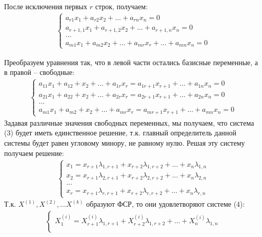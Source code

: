 \begin{answer}
  После исключения первых $r$ строк, получаем:
  \begin{gather*}
    \begin{cases}
      a_{r1} x_1 + a_{r2} x_2 + \ldots + a_{rn} x_{n} = 0 \\
      a_{r+1,1} x_1 + a_{r+1,2} x_2 + \ldots + a_{r+1,n} x_{n} = 0 \\
      \ldots \\
      a_{m1} x_1 + a_{m2} x_2 + \ldots + a_{mr} x_{r} + \ldots + a_{mn} x_{n} = 0
    \end{cases} \tag{2}
  \end{gather*}

  Преобразуем уравнения так, что в левой части остались базисные переменные, а в правой -- свободные:
  \begin{gather*}
    \begin{cases}
      a_{11} x_1 + a_{12} + x_2 + \ldots + a_{1r} x_{r} = a_{1r+1} x_{r+1} + \ldots + a_{1n} x_{n} = 0 \\
      a_{21} x_1 + a_{22} + x_2 + \ldots + a_{2r} x_{r} = a_{2r+1} x_{r+1} + \ldots + a_{2n} x_{n} = 0 \\
    \ldots \\
      a_{m1} x_1 + a_{m2} + x_2 + \ldots + a_{mr} x_{r} = a_{mr+1} x_{r+1} + \ldots + a_{mn} x_{n} = 0 \tag{3}
    \end{cases}
  \end{gather*}
  Задавая различные значения свободных переменных, мы получаем, что система (3) будет иметь единственное решение, т.к. главный определитель данной системы будет равен угловому минору, не равному нулю.
  Решая эту систему получаем решение:
  \begin{gather*}
    \begin{cases}
      x_1 = x_{r+1} \lambda_{1,r+1} + x_{r+2} \lambda_{1,r+2} + \ldots + x_{n} \lambda_{1, n} \\
      x_2 = x_{r+1} \lambda_{2,r+1} + x_{r+2} \lambda_{2,r+2} + \ldots + x_{n} \lambda_{2, n} \\
      \ldots \\
      x_r = x_{r+1} \lambda_{r,r+1} + x_{r+2} \lambda_{r,r+2} + \ldots + x_{n} \lambda_{r, n} \tag{4}
    \end{cases}
  \end{gather*}
  Т.к. $X^{(1)}, X^{(2)}, \ldots X^{(k)}$ образуют ФСР, то они удовлетворяют системе (4):
  \begin{gather*}
    \begin{cases}
      X_1^{(i)} = X_{r+1}^{(i)} \lambda_{1,r+1} + X_{r+2}^{(i)} \lambda_{1,r+2} + \ldots + X_{n}^{(i)} \lambda_{1, n} \\

\end{cases}
\end{gather*}
\end{answer}
